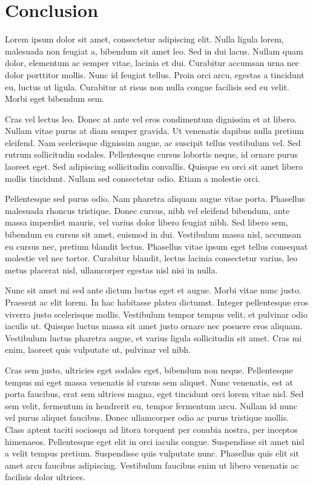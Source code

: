 \chapter{Conclusion}
Lorem ipsum dolor sit amet, consectetur adipiscing elit. Nulla ligula lorem, malesuada non feugiat a, bibendum sit amet leo. Sed in dui lacus. Nullam quam dolor, elementum ac semper vitae, lacinia et dui. Curabitur accumsan urna nec dolor porttitor mollis. Nunc id feugiat tellus. Proin orci arcu, egestas a tincidunt eu, luctus ut ligula. Curabitur at risus non nulla congue facilisis sed eu velit. Morbi eget bibendum sem.

Cras vel lectus leo. Donec at ante vel eros condimentum dignissim et at libero. Nullam vitae purus at diam semper gravida. Ut venenatis dapibus nulla pretium eleifend. Nam scelerisque dignissim augue, ac suscipit tellus vestibulum vel. Sed rutrum sollicitudin sodales. Pellentesque cursus lobortis neque, id ornare purus laoreet eget. Sed adipiscing sollicitudin convallis. Quisque eu orci sit amet libero mollis tincidunt. Nullam sed consectetur odio. Etiam a molestie orci.

Pellentesque sed purus odio. Nam pharetra aliquam augue vitae porta. Phasellus malesuada rhoncus tristique. Donec cursus, nibh vel eleifend bibendum, ante massa imperdiet mauris, vel varius dolor libero feugiat nibh. Sed libero sem, bibendum eu cursus sit amet, euismod in dui. Vestibulum massa nisl, accumsan eu cursus nec, pretium blandit lectus. Phasellus vitae ipsum eget tellus consequat molestie vel nec tortor. Curabitur blandit, lectus lacinia consectetur varius, leo metus placerat nisl, ullamcorper egestas nisl nisi in nulla.

Nunc sit amet mi sed ante dictum luctus eget et augue. Morbi vitae nunc justo. Praesent ac elit lorem. In hac habitasse platea dictumst. Integer pellentesque eros viverra justo scelerisque mollis. Vestibulum tempor tempus velit, et pulvinar odio iaculis ut. Quisque luctus massa sit amet justo ornare nec posuere eros aliquam. Vestibulum luctus pharetra augue, et varius ligula sollicitudin sit amet. Cras mi enim, laoreet quis vulputate ut, pulvinar vel nibh.

Cras sem justo, ultricies eget sodales eget, bibendum non neque. Pellentesque tempus mi eget massa venenatis id cursus sem aliquet. Nunc venenatis, est at porta faucibus, erat sem ultrices magna, eget tincidunt orci lorem vitae nisl. Sed sem velit, fermentum in hendrerit eu, tempor fermentum arcu. Nullam id nunc vel purus aliquet faucibus. Donec ullamcorper odio ac purus tristique mollis. Class aptent taciti sociosqu ad litora torquent per conubia nostra, per inceptos himenaeos. Pellentesque eget elit in orci iaculis congue. Suspendisse sit amet nisl a velit tempus pretium. Suspendisse quis vulputate nunc. Phasellus quis elit sit amet arcu faucibus adipiscing. Vestibulum faucibus enim ut libero venenatis ac facilisis dolor ultrices.